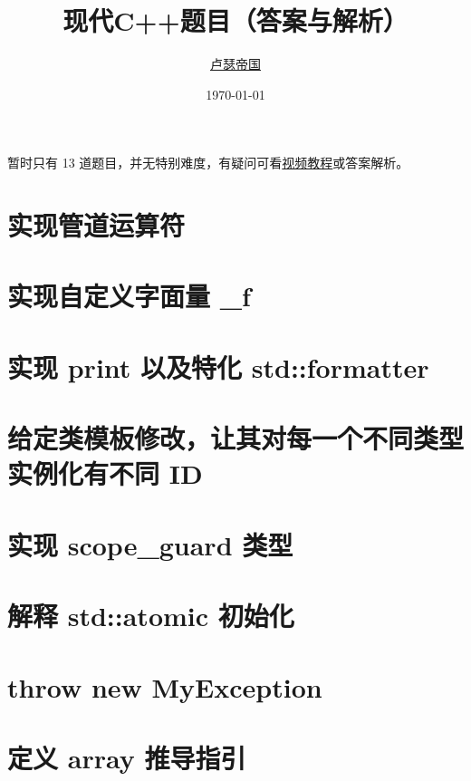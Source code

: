 \documentclass[11pt,fancyhdr]{ctexart}
\title{现代C++题目（答案与解析）}
\author{\href{https://github.com/Mq-b/Loser-HomeWork}{卢瑟帝国}\\}
\date{\today}
\begin{document}
\maketitle

\tableofcontents
\newpage

暂时只有 13 道题目，并无特别难度，有疑问可看\href{https://www.bilibili.com/video/BV1Zj411r7eP/}{视频教程}或答案解析。



\section{实现管道运算符}


\newpage

\section{实现自定义字面量 \_f}


\section{实现 print 以及特化 std::formatter}


\section{给定类模板修改，让其对每一个不同类型实例化有不同 ID}


\section{实现 scope\_guard 类型}


\section{解释 std::atomic 初始化}

\section{throw new MyException}

\section{定义 array 推导指引}
\end{document}
